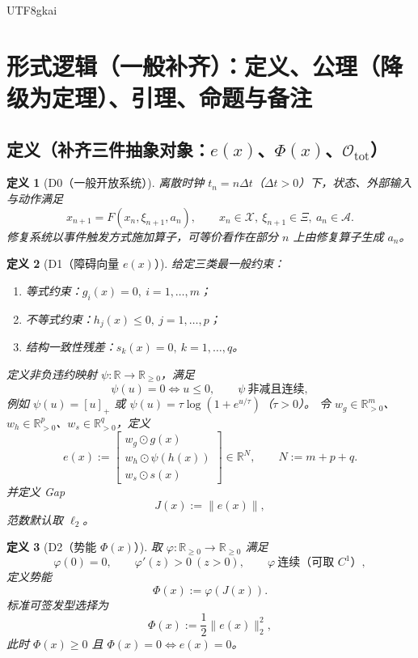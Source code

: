 \documentclass[12pt]{article}
\newtheorem{definition}{定义}[section]
\newcommand{\RR}{\mathbb{R}}
\begin{document}
\begin{CJK*}{UTF8}{gkai}
\section{形式逻辑（一般补齐）：定义、公理（降级为定理）、引理、命题与备注}
\label{sec:tex28-ch15}

\subsection{定义（补齐三件抽象对象：$e(x)$、$\Phi(x)$、$\mathcal O_{\mathrm{tot}}$）}
\label{subsec:tex28-ch15-defs}

\begin{definition}[D0（一般开放系统）]
\label{def:tex28-ch15-d0}
离散时钟 $t_n=n\Delta t$（$\Delta t>0$）下，状态、外部输入与动作满足
\[
  x_{n+1}=F(x_n,\xi_{n+1},a_n),
  \qquad
  x_n\in\mathcal X,\ \xi_{n+1}\in\Xi,\ a_n\in\mathcal A.
\]
修复系统以事件触发方式施加算子，可等价看作在部分 $n$ 上由修复算子生成 $a_n$。
\end{definition}

\begin{definition}[D1（障碍向量 $e(x)$）]
\label{def:tex28-ch15-d1}
给定三类最一般约束：
\begin{enumerate}
  \item 等式约束：$g_i(x)=0,\ i=1,\dots,m$；
  \item 不等式约束：$h_j(x)\le 0,\ j=1,\dots,p$；
  \item 结构一致性残差：$s_k(x)=0,\ k=1,\dots,q$。
\end{enumerate}
定义非负违约映射 $\psi:\RR\to\RR_{\ge 0}$，满足
\[
  \psi(u)=0\iff u\le 0,\qquad \psi\ \text{非减且连续},
\]
例如 $\psi(u)=[u]_+$ 或 $\psi(u)=\tau\log(1+e^{u/\tau})$（$\tau>0$）。
令 $w_g\in\RR_{>0}^{m}$、$w_h\in\RR_{>0}^{p}$、$w_s\in\RR_{>0}^{q}$，定义
\[
  e(x):=
  \begin{bmatrix}
    w_g\odot g(x)\\
    w_h\odot \psi(h(x))\\
    w_s\odot s(x)
  \end{bmatrix}
  \in\RR^N,\qquad N:=m+p+q.
\]
并定义 Gap
\[
  J(x):=\|e(x)\|,
\]
范数默认取 $\ell_2$。
\end{definition}

\begin{definition}[D2（势能 $\Phi(x)$）]
\label{def:tex28-ch15-d2}
取 $\varphi:\RR_{\ge 0}\to\RR_{\ge 0}$ 满足
\[
  \varphi(0)=0,\qquad \varphi'(z)>0\ (z>0),\qquad \varphi\ \text{连续（可取 }C^1\text{）},
\]
定义势能
\[
  \Phi(x):=\varphi(J(x)).
\]
标准可签发型选择为
\[
  \Phi(x):=\frac12\|e(x)\|_2^2,
\]
此时 $\Phi(x)\ge 0$ 且 $\Phi(x)=0\iff e(x)=0$。
\end{definition}


\end{CJK*}
\end{document}
